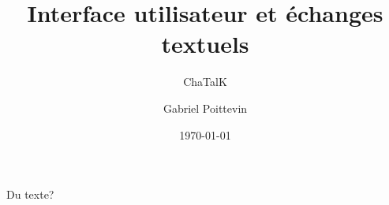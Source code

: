 \documentclass[hyperref={pdfpagemode=FullScreen,
colorlinks=true}]{beamer}
\title[Présentation]{Interface utilisateur et échanges textuels}
\subtitle[\ldots]{ChaTalK}
\author[Poittevin]{Gabriel Poittevin}
\institute[ALGGOT™]{ALGGOT™}
\date{\today}
\begin{document}
	\maketitle

	\begin{frame}
    Du texte?
	\end{frame}
\end{document}
